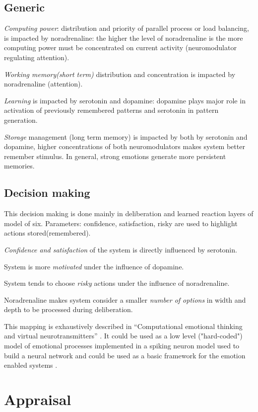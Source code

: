 \subsection{Generic}

\emph{Computing power}: distribution and priority of parallel process or load balancing, is impacted by noradrenaline: the higher the level of noradrenaline is the more computing power must be concentrated on current activity (neuromodulator regulating attention).

\emph{Working memory(short term)} distribution and concentration is impacted by noradrenaline (attention).

\emph{Learning} is impacted by serotonin and dopamine: dopamine plays major role in activation of previously remembered patterns and serotonin in pattern generation.

\emph{Storage} management (long term memory) is impacted by both by serotonin and dopamine, higher concentrations of both neuromodulators makes system better remember stimulus. In general, strong emotions generate more persistent memories.

\subsection{Decision making}

This decision making is done mainly in deliberation and learned reaction layers of model of six.
Parameters: confidence, satisfaction, risky are used to highlight actions stored(remembered).

\emph{Confidence and satisfaction} of the system is directly influenced by serotonin.

System is more \emph{motivated} under the influence of dopamine.

System tends to choose \emph{risky} actions under the influence of noradrenaline.

Noradrenaline makes system consider a smaller \emph{number of options} in width and depth to be processed during deliberation.

This mapping is exhaustively described in ``Computational emotional thinking and virtual neurotransmitters'' \cite{computational_emotional_thinking}. It could be used as a low level ("hard-coded") model of emotional processes implemented in a spiking neuron model used to build a neural network and could be used as a basic framework for the emotion enabled systems \cite{whatdoesitmeanforcomputer}.

\section{Appraisal}

